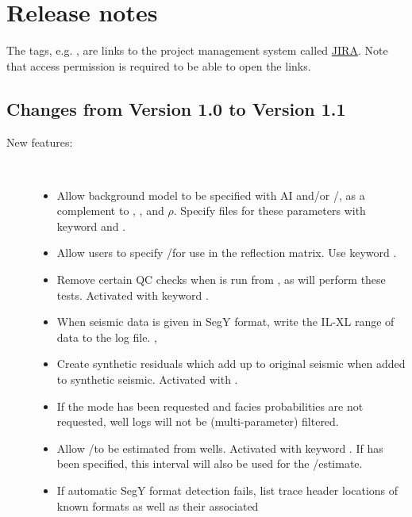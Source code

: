 \chapter{Release notes}
The tags, e.g. , are links to the \crava project management
system called
\href{http://www.atlassian.com/software/jira/}{JIRA}.
 Note that access permission is
required to be able to open the links.

\section{Changes from \crava Version 1.0 to Version 1.1}

\begin{description}

\item [New features:] \mbox{ }
  \begin{itemize}
    \item Allow background model to be specified with AI and\!/\!or
      \vp/\vs, as a complement to \vp, \vs, and $\rho$. Specify files
      for these parameters with keyword  and
      . 
    \item Allow users to specify \vp/\vs for use in the
      reflection matrix.  Use keyword . 
    \item Remove certain QC checks when \crava is run from
      \rms, as \rms will perform these tests. Activated with keyword
      . 
    \item When seismic data is given in SegY format, write the IL-XL
      range of data to the log file. , 
    \item Create synthetic residuals which add up to original seismic
      when added to synthetic seismic. Activated with
      . 
    \item If the  mode has been requested and
      facies probabilities are not requested, well logs will not be
      (multi-parameter) filtered. 
    \item Allow \vp/\vs to be estimated from wells. Activated
      with keyword . If
       has been specified, this
      interval will also be used for the \vp/\vs estimate. 
    \item If automatic SegY format detection fails, list trace
      header locations of known formats as well as their associated

\end{itemize}
\end{description}
